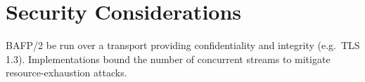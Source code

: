 \section{Security Considerations}
BAFP/2  be run over a transport providing confidentiality and integrity (e.g.\
TLS 1.3). Implementations  bound the number of concurrent streams to mitigate
resource-exhaustion attacks.
